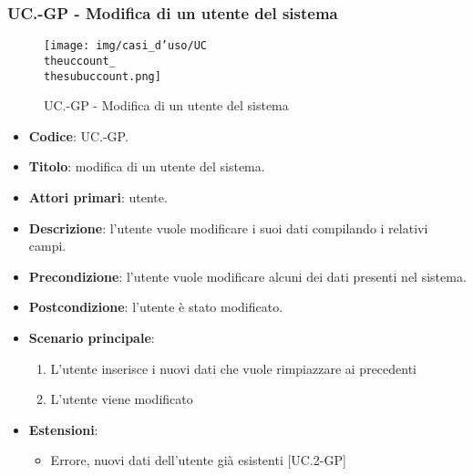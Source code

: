 		\subsubsection{UC\theuccount.\thesubuccount-GP - Modifica di un utente del sistema}
			\begin{figure}[H]
				\centering
				\texttt{[image: img/casi\_d'uso/UC\\theuccount\_\\thesubuccount.png]}\\
				\caption{UC\theuccount.\thesubuccount-GP - Modifica di un utente del sistema}
			\end{figure}
			\begin{itemize}
				\item \textbf{Codice}: UC\theuccount.\thesubuccount-GP.
				\item \textbf{Titolo}: modifica di un utente del sistema.
				\item \textbf{Attori primari}: utente.
				\item \textbf{Descrizione}: l'utente vuole modificare i suoi dati compilando i relativi campi.
				\item \textbf{Precondizione}: l'utente vuole modificare alcuni dei dati presenti nel sistema.
				\item \textbf{Postcondizione}: l'utente è stato modificato.
				\item \textbf{Scenario principale}:
				\begin{enumerate}
					\item L'utente inserisce i nuovi dati che vuole rimpiazzare ai precedenti
					\item L'utente viene modificato
				\end{enumerate}
				\item \textbf{Estensioni}:
				\begin{itemize}
					\item Errore, nuovi dati dell'utente già esistenti [UC\theuccount.2-GP]
				\end{itemize}
			\end{itemize}

